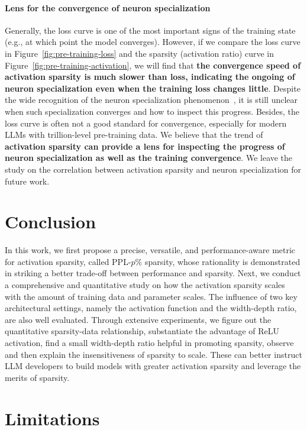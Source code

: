\documentclass{article} %
\begin{document}
\paragraph{Lens for the convergence of neuron specialization} Generally, the loss curve is one of the most important signs of the training state (e.g., at which point the model converges). However, if we compare the loss curve in Figure~\ref{fig:pre-training-loss} and the sparsity (activation ratio) curve in Figure~\ref{fig:pre-training-activation}, we will find that \textbf{the convergence speed of activation sparsity is much slower than loss, indicating the ongoing of neuron specialization even when the training loss changes little}. Despite the wide recognition of the neuron specialization phenomenon~\citep{li2022lazy,zhang2023emergent}, it is still unclear when such specialization converges and how to inspect this progress. Besides, the loss curve is often not a good standard for convergence, especially for modern LLMs with trillion-level pre-training data. We believe that the trend of \textbf{activation sparsity can provide a lens for inspecting the progress of neuron specialization as well as the training convergence}. We leave the study on the correlation between activation sparsity and neuron specialization for future work.

\section{Conclusion}

In this work, we first propose a precise, versatile, and performance-aware metric for activation sparsity, called PPL-$p\%$ sparsity, whose rationality is demonstrated in striking a better trade-off between performance and sparsity. Next, we conduct a comprehensive and quantitative study on how the activation sparsity scales with the amount of training data and parameter scales. The influence of two key architectural settings, namely the activation function and the width-depth ratio, are also well evaluated. Through extensive experiments, we figure out the quantitative sparsity-data relationship, substantiate the advantage of ReLU activation, find a small width-depth ratio helpful in promoting sparsity, observe and then explain the insensitiveness of sparsity to scale. These can better instruct LLM developers to build models with greater activation sparsity and leverage the merits of sparsity.

\section*{Limitations}
\end{document}
